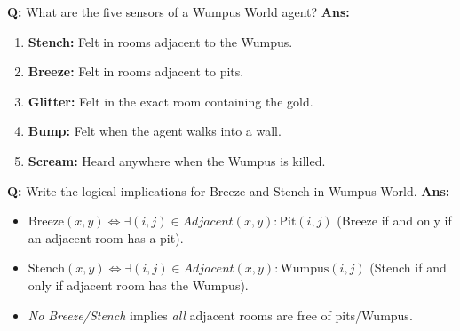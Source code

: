 \documentclass[10pt,a4paper,twocolumn]{article}
\begin{document}
\begin{tcolorbox}[
  colback=white,
  colframe=UnitColorSeven,
  colbacktitle=gray!10!white,
  coltitle=black,
  fonttitle=\bfseries\sffamily\small,
  title={Unit VII $\bullet$ Card 6: Wumpus World Sensors},
  boxrule=1.2pt,
  arc=2mm,
  outer arc=2mm,
  boxsep=1.5mm,
  top=1mm,
  bottom=1mm,
  left=1.5mm,
  right=1.5mm,
  before skip=2.5mm,
  after skip=2.5mm
]
\textbf{Q:} What are the five sensors of a Wumpus World agent?
\tcbline
\textbf{Ans:} \begin{enumerate}
  \item \textbf{Stench:} Felt in rooms adjacent to the Wumpus.
  \item \textbf{Breeze:} Felt in rooms adjacent to pits.
  \item \textbf{Glitter:} Felt in the exact room containing the gold.
  \item \textbf{Bump:} Felt when the agent walks into a wall.
  \item \textbf{Scream:} Heard anywhere when the Wumpus is killed.
\end{enumerate}
\end{tcolorbox}


\begin{tcolorbox}[
  colback=white,
  colframe=UnitColorSeven,
  colbacktitle=gray!10!white,
  coltitle=black,
  fonttitle=\bfseries\sffamily\small,
  title={Unit VII $\bullet$ Card 7: Pit and Wumpus logical rules},
  boxrule=1.2pt,
  arc=2mm,
  outer arc=2mm,
  boxsep=1.5mm,
  top=1mm,
  bottom=1mm,
  left=1.5mm,
  right=1.5mm,
  before skip=2.5mm,
  after skip=2.5mm
]
\textbf{Q:} Write the logical implications for Breeze and Stench in Wumpus World.
\tcbline
\textbf{Ans:} \begin{itemize}
  \item   $\text{Breeze}(x,y) \Leftrightarrow \exists (i,j) \in Adjacent(x,y) : \text{Pit}(i,j)$ (Breeze if and only if an adjacent room has a pit).
  \item   $\text{Stench}(x,y) \Leftrightarrow \exists (i,j) \in Adjacent(x,y) : \text{Wumpus}(i,j)$ (Stench if and only if adjacent room has the Wumpus).
  \item   \textit{No Breeze/Stench} implies \textit{all} adjacent rooms are free of pits/Wumpus.
\end{itemize}
\end{tcolorbox}
\end{document}
